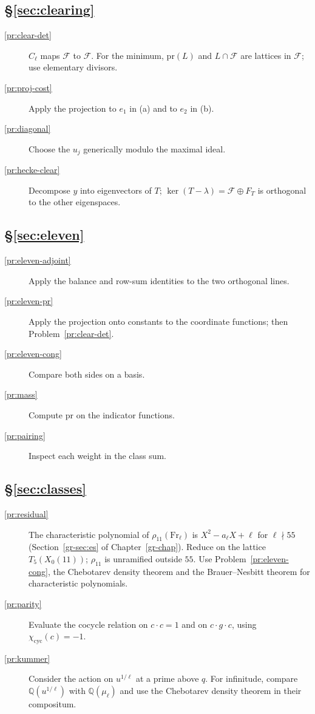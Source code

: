 \documentclass[reqno]{amsart}
\newcounter{chap}
\theoremstyle{definition}
\newcommand{\Q}{\mathbb{Q}}
\newcommand{\pr}{\mathrm{pr}}
\newcommand{\Frob}{\mathrm{Fr}}
\newcommand{\cyc}{\chi_{\mathrm{cyc}}}
\begin{document}
\subsection*{\S\ref{sec:clearing}}
\begin{description}
\item[\ref{pr:clear-det}] \(C_\ell\) maps \(\mathcal F\) to \(\mathcal F\).  For the minimum, \(\pr(L)\) and \(L \cap \mathcal F\) are lattices in \(\mathcal F\); use elementary divisors.
\item[\ref{pr:proj-cost}] Apply the projection to \(e_1\) in (a) and to \(e_2\) in (b).
\item[\ref{pr:diagonal}] Choose the \(u_j\) generically modulo the maximal ideal.
\item[\ref{pr:hecke-clear}] Decompose \(y\) into eigenvectors of \(T\); \(\ker(T - \lambda) = \mathcal F \oplus F_T\) is orthogonal to the other eigenspaces.
\end{description}

\subsection*{\S\ref{sec:eleven}}
\begin{description}
\item[\ref{pr:eleven-adjoint}] Apply the balance and row-sum identities to the two orthogonal lines.
\item[\ref{pr:eleven-pr}] Apply the projection onto constants to the coordinate functions; then Problem~\ref{pr:clear-det}.
\item[\ref{pr:eleven-cong}] Compare both sides on a basis.
\item[\ref{pr:mass}] Compute \(\pr\) on the indicator functions.
\item[\ref{pr:pairing}] Inspect each weight in the class sum.
\end{description}

\subsection*{\S\ref{sec:classes}}
\begin{description}
\item[\ref{pr:residual}] The characteristic polynomial of \(\rho_{11}(\Frob_\ell)\) is \(X^2 - a_\ell X + \ell\) for \(\ell \nmid 55\) (Section~\ref{gr-sec:es} of Chapter~\ref{gr-chap}).  Reduce on the lattice \(T_5(X_0(11))\); \(\rho_{11}\) is unramified outside \(55\).  Use Problem~\ref{pr:eleven-cong}, the Chebotarev density theorem and the Brauer--Nesbitt theorem for characteristic polynomials.
\item[\ref{pr:parity}] Evaluate the cocycle relation on \(c \cdot c = 1\) and on \(c \cdot g \cdot c\), using \(\cyc(c) = -1\).
\item[\ref{pr:kummer}] Consider the action on \(u^{1/\ell}\) at a prime above \(q\).  For infinitude, compare \(\Q(u^{1/\ell})\) with \(\Q(\mu_\ell)\) and use the Chebotarev density theorem in their compositum.
\end{description}
\end{document}
